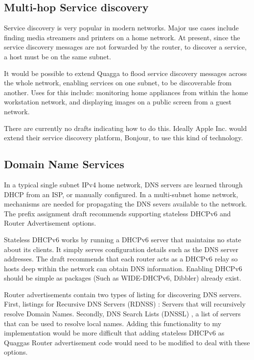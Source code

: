\documentclass[12pt,a4paper,twoside]{report}
\begin{document}
\subsection{Multi-hop Service discovery}
Service discovery is very popular in modern networks. Major use cases include
finding media streamers and printers on a home network. At present, since the
service discovery messages are not forwarded by the router, to discover a
service, a host must be on the same subnet.

It would be possible to extend Quagga to flood service discovery
messages across the whole network, enabling services on one subnet, to be
discoverable from another. Uses for this include: monitoring home appliances from
within the home workstation network, and displaying images on a public screen
from a guest network.

There are currently no drafts indicating how to do this. Ideally Apple Inc.\@
would extend their service discovery platform, Bonjour, to use this kind of
technology.

\subsection{Domain Name Services}
In a typical single subnet IPv4 home network, DNS servers  are learned through
DHCP from an ISP, or manually configured. In a multi-subnet home network,
mechanisms are needed for propagating the DNS severs available to the network.
The prefix assignment draft recommends supporting stateless DHCPv6 and Router
Advertisement options.

Stateless DHCPv6 works by running a DHCPv6 server that maintains no state about
its clients. It simply serves configuration details such as the DNS server
addresses. The draft recommends that each router acts as a DHCPv6 relay so
hosts deep within the network can obtain DNS information.  Enabling DHCPv6
should be simple as packages (Such as WIDE-DHCPv6, Dibbler) already exist. 

Router advertisements contain two types of listing for discovering DNS servers.
First, listings for Recursive DNS Servers (RDNSS)
: Servers that will recursively
resolve Domain Names. Secondly, DNS Search Lists (DNSSL)
, a list of servers that can be used to
resolve local names. Adding this functionality to my implementation would be
more difficult that adding stateless DHCPv6 as Quaggas Router advertisement
code would need to be modified to deal with these options.
\end{document}
